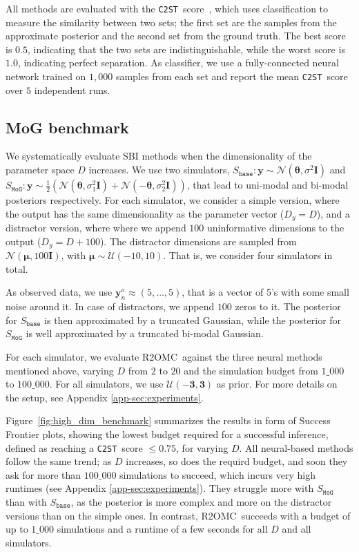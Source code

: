 \documentclass[twoside]{article}
\newcommand{\thb}{\boldsymbol{\theta}}
\newcommand{\yb}{\mathbf{y}}
\newcommand{\data}{\mathbf{y}^o}
\newcommand{\rromc}{R2OMC}
\newcommand{\CtwoST}{\texttt{C2ST}}
\begin{document}
All methods are evaluated with the \CtwoST~score~\citep{gutmann2018likelihood, lueckmann2021benchmarking}, which uses classification to measure the similarity between two sets; the first set are the samples from the approximate posterior and the second set from the ground truth. The best score is $0.5$, indicating that the two sets are indistinguishable, while the worst score is $1.0$, indicating perfect separation.
As classifier, we use a fully-connected neural network trained on $1,000$ samples from each set and report the mean \CtwoST~score over $5$ independent runs.

\subsection{MoG benchmark}
\label{subsec:gaussian}

We systematically evaluate SBI methods when the dimensionality of the parameter space $D$ increases.
We use two simulators,
$S_{\mathtt{base}}: \yb \sim \mathcal{N}(\thb, \sigma^2 \mathbf{I})$ and
$S_{\mathtt{MoG}}: \yb \sim \frac{1}{2}\left ( \mathcal{N}(\thb, \sigma_1^2 \mathbf{I}) + \mathcal{N}(-\thb, \sigma_2^2\mathbf{I})\right)$, that lead to uni-modal and bi-modal posteriors respectively.
For each simulator, we consider a simple version, where the output has the same dimensionality as the parameter vector ($D_y = D$), and a distractor version, where where we append $100$ uninformative dimensions to the output ($D_y = D + 100$).
The distractor dimensions are sampled from $\mathcal{N}(\boldsymbol{\mu}, 100 \mathbf{I})$, with $\boldsymbol{\mu} \sim \mathcal{U}(-10, 10)$.
That is, we consider four simulators in total.

As observed data, we use $\data_n \approx (5, \ldots, 5)$, that is a vector of 5's with some small noise around it.
In case of distractors, we append $100$ zeros to it. 
The posterior for $S_{\mathtt{base}}$ is then approximated by a truncated Gaussian, while the posterior for $S_{\mathtt{MoG}}$ is well approximated by a truncated bi-modal Gaussian.

For each simulator, we evaluate \rromc~against the three neural methods mentioned above, varying $D$ from $2$ to $20$ and the simulation budget from $1\_000$ to $100\_000$.
For all simulators, we use $\mathcal{U}(\mathbf{-3}, \mathbf{3})$ as prior.
For more details on the setup, see Appendix \ref{app-sec:experiments}.

Figure~\ref{fig:high_dim_benchmark} summarizes the results in form of Success Frontier plots, showing the lowest budget required for a successful inference, defined as reaching a \CtwoST~score $\leq 0.75$, for varying $D$.
All neural-based methods follow the same trend; as $D$ increases, so does the requird budget, and soon they ask for more than $100\_000$ simulations to succeed, which incurs very high runtimes (see Appendix \ref{app-sec:experiments}).
They struggle more with $S_{\mathtt{MoG}}$ than with $S_{\mathtt{base}}$, as the posterior is more complex and more on the distractor versions than on the simple ones.
In contrast, \rromc~succeeds with a budget of up to $1\_000$ simulations and a runtime of a few seconds for all $D$ and all simulators.
\end{document}

